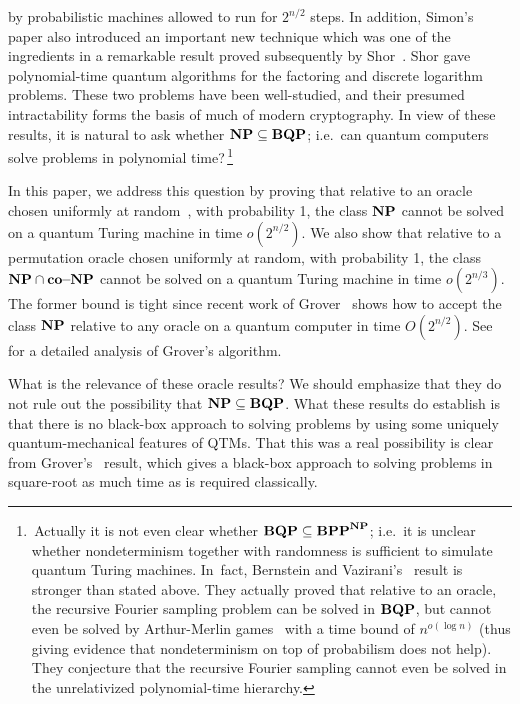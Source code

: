 by probabilistic machines allowed to run for $2^{n/2}$ steps.
In addition, Simon's paper also introduced an important new technique which
was one of the ingredients in a remarkable result proved subsequently by
Shor~\cite{Sh}.  Shor gave polynomial-time quantum algorithms for the factoring
and discrete logarithm problems.  These two problems have been well-studied,
and their presumed \mbox{intractability} forms the basis of much of modern
cryptography.  In view of these results, it is natural to ask whether
$\mbox{\bf NP} \subseteq \mbox{\bf BQP}$; i.e.~can quantum computers solve \npc{} problems in
polynomial time?\,\footnote{\samepage\,Actually it is not even clear whether
$\mbox{\bf BQP} \subseteq \mbox{\bf BPP}^{\mbox{\scriptsize\bf NP}}$; i.e.~it is unclear whether
nondeterminism together with randomness is sufficient to simulate quantum
Turing machines. In~fact, Bernstein and Vazirani's~\cite{BV} result is stronger
than stated above.  They actually proved that relative to an oracle, the
recursive Fourier sampling problem can be solved in $\mbox{\bf BQP}$, but cannot even be
solved by Arthur-Merlin games~\cite{babai} with a time bound of $n^{o(\log n)}$
(thus giving evidence that nondeterminism on top of probabilism
does not help).  They conjecture that the recursive Fourier sampling cannot
even be solved in the unrelativized polynomial-time hierarchy.}

In this paper, we address this question by proving that
relative to an oracle chosen uniformly at random~\cite{BG}, with probability 1,
the class $\mbox{\bf NP}$ cannot be solved on a quantum Turing machine in time
$o(2^{n/2})$. We also show that relative to a permutation oracle chosen
uniformly at random, with probability 1, the class $\mbox{\bf NP} \cap \mbox{\bf co--NP}$ cannot be
solved on a quantum Turing machine in time $o(2^{n/3})$.  The former bound is
tight since recent work of Grover~\cite{Gr} shows how to accept the class $\mbox{\bf NP}$
relative to any oracle on a quantum computer in time $O(2^{n/2})$.
See~\cite{BBHT} for a detailed analysis of Grover's algorithm.

What is the relevance of these oracle results?
We should emphasize that they do not rule out the possibility
that $\mbox{\bf NP} \subseteq \mbox{\bf BQP}$.
What these results do establish is that
there is no black-box approach to solving \npc{} problems by using some
uniquely quantum-mechanical features of QTMs. That this was a real possibility
is clear from Grover's~\cite{Gr} result, which gives a black-box approach to
solving \npc{} problems in square-root as much time as is required classically.

